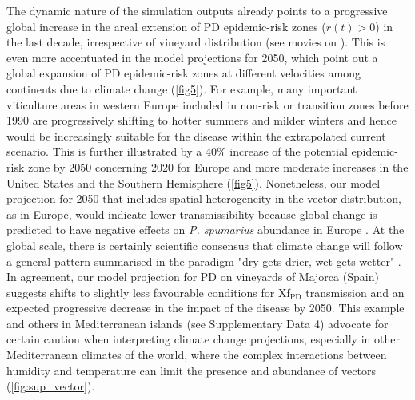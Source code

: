     The dynamic nature of the simulation outputs already points to a
    progressive
    global increase in the areal extension of PD epidemic-risk zones ($r(t)>0$)
    in
    the last decade, irrespective of vineyard distribution (see movies on
    \cite{Webpage}). This is even more accentuated in the model projections for
    2050, which point out a global expansion of PD epidemic-risk zones at
    different
    velocities among continents due to climate change (\cref{fig5}). For
    example,
    many important viticulture areas in western Europe included in non-risk or
    transition zones before 1990 are progressively shifting to hotter summers
    and
    milder winters and hence would be increasingly suitable for the disease
    within
    the extrapolated current scenario. This is further illustrated by a $40\%$
    increase of the potential epidemic-risk zone by 2050 concerning 2020 for
    Europe
    and more moderate increases in the United States and the Southern
    Hemisphere
    (\cref{fig5}). Nonetheless, our model projection for 2050 that includes
    spatial
    heterogeneity in the vector distribution, as in Europe, would indicate
    lower
    transmissibility because global change is predicted to have negative
    effects on
    \textit{P. spumarius} abundance in Europe \cite{Godefroid2021,Karban2018}.
    At
    the global scale, there is certainly scientific consensus that climate
    change
    will follow a general pattern summarised in the paradigm "dry gets drier,
    wet
    gets wetter" \cite{Feng2015}. In agreement, our model projection for PD on
    vineyards of Majorca (Spain) suggests shifts to slightly less favourable
    conditions for Xf$_{\textrm{PD}}$ transmission and an expected progressive
    decrease in the impact of the disease by 2050. This example and others in
    Mediterranean islands (see Supplementary Data 4) advocate for certain
    caution
    when interpreting climate change projections, especially in other
    Mediterranean
    climates of the world, where the complex interactions between humidity and
    temperature can limit the presence and abundance of vectors
    (\cref{fig:sup_vector}).

